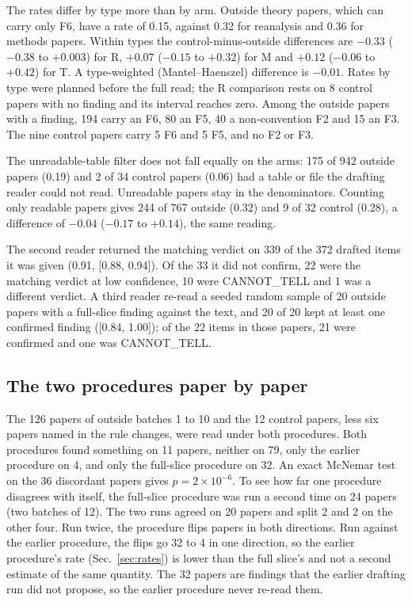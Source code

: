 \documentclass[reprint,amsmath,amssymb,aps,superscriptaddress,nofootinbib]{revtex4-2}
\begin{document}
The rates differ by type more than by arm. Outside theory papers, which can carry only F6, have a rate of 0.15, against 0.32 for reanalysis and 0.36 for methods papers. Within types the control-minus-outside differences are $-0.33$ ($-0.38$ to $+0.003$) for R, $+0.07$ ($-0.15$ to $+0.32$) for M and $+0.12$ ($-0.06$ to $+0.42$) for T. A type-weighted (Mantel--Haenszel) difference is $-0.01$. Rates by type were planned before the full read; the R comparison rests on 8 control papers with no finding and its interval reaches zero. Among the outside papers with a finding, 194 carry an F6, 80 an F5, 40 a non-convention F2 and 15 an F3. The nine control papers carry 5 F6 and 5 F5, and no F2 or F3.

The unreadable-table filter does not fall equally on the arms: 175 of 942 outside papers (0.19) and 2 of 34 control papers (0.06) had a table or file the drafting reader could not read. Unreadable papers stay in the denominators. Counting only readable papers gives 244 of 767 outside (0.32) and 9 of 32 control (0.28), a difference of $-0.04$ ($-0.17$ to $+0.14$), the same reading.

The second reader returned the matching verdict on 339 of the 372 drafted items it was given (0.91, [0.88, 0.94]). Of the 33 it did not confirm, 22 were the matching verdict at low confidence, 10 were CANNOT\_TELL and 1 was a different verdict. A third reader re-read a seeded random sample of 20 outside papers with a full-slice finding against the text, and 20 of 20 kept at least one confirmed finding ([0.84, 1.00]); of the 22 items in those papers, 21 were confirmed and one was CANNOT\_TELL.

\subsection{The two procedures paper by paper}

The 126 papers of outside batches 1 to 10 and the 12 control papers, less six papers named in the rule changes, were read under both procedures. Both procedures found something on 11 papers, neither on 79, only the earlier procedure on 4, and only the full-slice procedure on 32. An exact McNemar test on the 36 discordant papers gives $p = 2\times10^{-6}$. To see how far one procedure disagrees with itself, the full-slice procedure was run a second time on 24 papers (two batches of 12). The two runs agreed on 20 papers and split 2 and 2 on the other four. Run twice, the procedure flips papers in both directions. Run against the earlier procedure, the flips go 32 to 4 in one direction, so the earlier procedure's rate (Sec.~\ref{sec:rates}) is lower than the full slice's and not a second estimate of the same quantity. The 32 papers are findings that the earlier drafting run did not propose, so the earlier procedure never re-read them.
\end{document}

